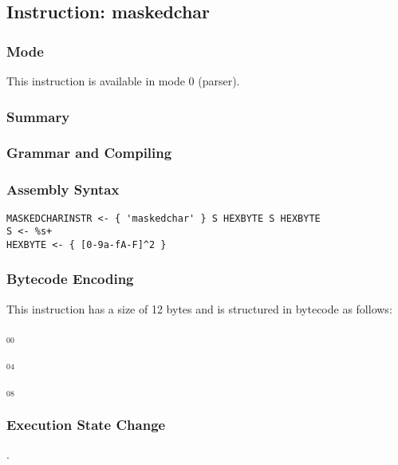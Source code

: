 \subsection{Instruction: maskedchar}

\subsubsection{Mode}
This instruction is available in mode 0 (parser).
\subsubsection{Summary}


\subsubsection{Grammar and Compiling}


\subsubsection{Assembly Syntax}

\begin{myquote}
\begin{verbatim}
MASKEDCHARINSTR <- { 'maskedchar' } S HEXBYTE S HEXBYTE
S <- %s+
HEXBYTE <- { [0-9a-fA-F]^2 }
\end{verbatim}
\end{myquote}

\subsubsection{Bytecode Encoding}

This instruction has a size of 12 bytes and is structured in bytecode as follows:

$_{00}$\ 



$_{04}$\ 



$_{08}$\ 
\fbox{%
  \parbox{20pt}{%
00
  }%
}

\subsubsection{Execution State Change}

.


